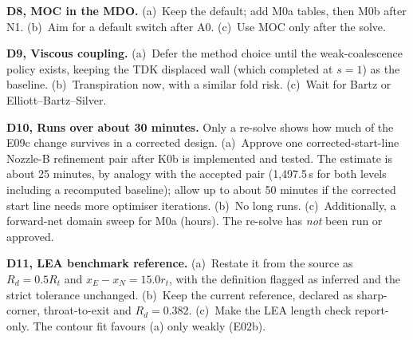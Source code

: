 \textbf{D8, MOC in the MDO.}
(a)~Keep the default; add M0a tables, then M0b after N1.
(b)~Aim for a default switch after A0.
(c)~Use MOC only after the solve.

\textbf{D9, Viscous coupling.}
(a)~Defer the method choice until the weak-coalescence policy exists, keeping the TDK
displaced wall (which completed at $s=1$) as the baseline.
(b)~Transpiration now, with a similar fold risk.
(c)~Wait for Bartz or Elliott--Bartz--Silver.

\textbf{D10, Runs over about 30 minutes.} Only a re-solve shows how much of the E09c
change survives in a corrected design.
(a)~Approve one corrected-start-line Nozzle-B refinement pair after K0b is implemented
and tested. The estimate is about 25 minutes, by analogy with the accepted pair
(1{,}497.5\,s for both levels including a recomputed baseline); allow up to about
50 minutes if the corrected start line needs more optimiser iterations.
(b)~No long runs.
(c)~Additionally, a forward-net domain sweep for M0a (hours).
The re-solve has \emph{not} been run or approved.

\textbf{D11, LEA benchmark reference.}
(a)~Restate it from the source as $R_d=0.5R_t$ and $x_E-x_N=15.0r_t$, with the
definition flagged as inferred and the strict tolerance unchanged.
(b)~Keep the current reference, declared as sharp-corner, throat-to-exit and
$R_d=0.382$.
(c)~Make the LEA length check report-only.
The contour fit favours (a) only weakly (E02b).
